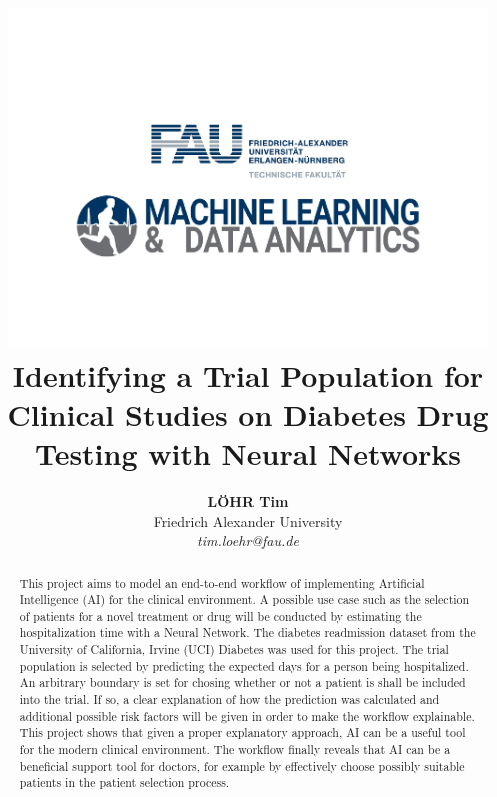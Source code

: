 \documentclass[journal]{IEEEtran}
\begin{document}
    \title{
    	\includegraphics[width=5in]{../imgs/logo_paper3.pdf} 
    	\newline
     Identifying a Trial Population for Clinical Studies on Diabetes Drug Testing with Neural Networks \\ 
     }

  \author{\textbf{L\"OHR Tim} \\ Friedrich Alexander University \\ \textit{tim.loehr@fau.de}}




\maketitle
\begin{abstract}
This project aims to model an end-to-end workflow of implementing Artificial Intelligence (AI) for the clinical environment. A possible use case such as the selection of patients for a novel treatment or drug will be conducted by estimating the hospitalization time with a Neural Network.
The diabetes readmission dataset from the University of California, Irvine (UCI) Diabetes was used for this project. The trial population is selected by predicting the expected days for a person being hospitalized. An arbitrary boundary is set for chosing whether or not a patient is shall be included into the trial. If so, a clear explanation of how the prediction was calculated and additional possible risk factors will be given in order to make the workflow explainable. This project shows that given a proper explanatory approach, AI can be a useful tool for the modern clinical environment. The workflow finally reveals that AI can be a beneficial support tool for doctors, for example by effectively choose possibly suitable patients in the patient selection process. 
\end{abstract}
\end{document}
